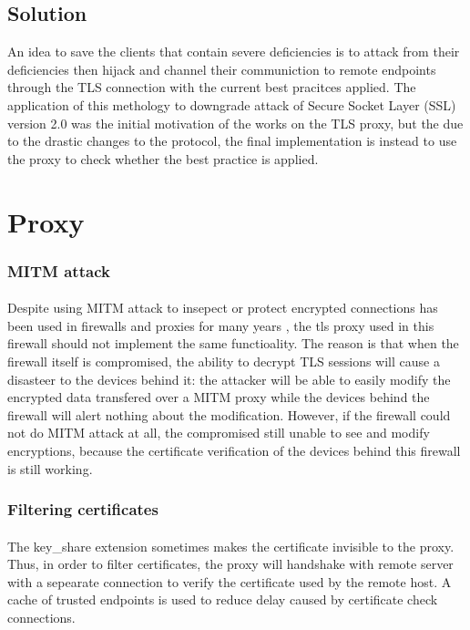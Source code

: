 \documentclass[mscthesis]{usiinfthesis}
\begin{document}
\subsection{Solution}
An idea to save the clients that contain severe deficiencies is to attack from their deficiencies then hijack and channel their communiction to remote endpoints through the TLS connection with the current best pracitces applied. The application of this methology to downgrade attack of Secure Socket Layer (SSL) version 2.0 was the initial motivation of the works on the TLS proxy, but the due to the drastic changes to the protocol, the final implementation is instead to use the proxy to check whether the best practice is applied.


\section{Proxy}
\subsubsection{MITM attack}
\paragraph{}
Despite using MITM attack to insepect or protect encrypted connections has been used in firewalls and proxies for many years \citep{fortigate:deepinspection}, the tls proxy used in this firewall should not implement the same functioality. The reason is that when the firewall itself is compromised, the ability to decrypt TLS sessions will cause a disasteer to the devices behind it: the attacker will be able to easily modify the encrypted data transfered over a MITM proxy while the devices behind the firewall will alert nothing about the modification. However, if the firewall could not do MITM attack at all, the compromised still unable to see and modify encryptions, because the certificate verification of the devices behind this firewall is still working.
\subsubsection{Filtering certificates}
\paragraph{}
The key\_share extension sometimes makes the certificate invisible to the proxy. Thus, in order to filter certificates, the proxy will handshake with remote server with a sepearate connection to verify the certificate used by the remote host. A cache of trusted endpoints is used to reduce delay caused by certificate check connections.
\end{document}
